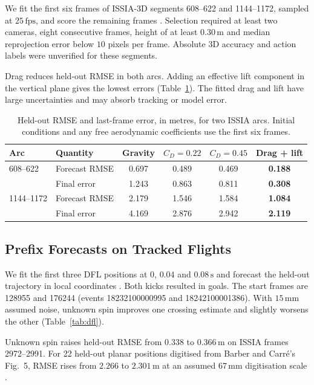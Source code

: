 \documentclass[11pt,a4paper]{article}
\begin{document}
We fit the first six frames of ISSIA-3D segments 608--622 and 1144--1172, sampled at $25\,\mathrm{fps}$, and score the remaining frames \cite{soccernetv3d,issia}. Selection required at least two cameras, eight consecutive frames, height of at least $0.30\,\mathrm{m}$ and median reprojection error below $10$ pixels per frame. Absolute 3D accuracy and action labels were unverified for these segments.

Drag reduces held-out RMSE in both arcs. Adding an effective lift component in the vertical plane gives the lowest errors (Table~\ref{tab:issia}). The fitted drag and lift have large uncertainties and may absorb tracking or model error.

\begin{table}[htbp]
  \centering
  \caption{Held-out RMSE and last-frame error, in metres, for two ISSIA arcs. Initial conditions and any free aerodynamic coefficients use the first six frames.}
  \label{tab:issia}
  \begin{tabular}{llcccc}
    \toprule
    Arc & Quantity & Gravity & $C_D=0.22$ & $C_D=0.45$ & Drag + lift \\
    \midrule
    608--622 & Forecast RMSE & 0.697 & 0.489 & 0.469 & \textbf{0.188} \\
             & Final error   & 1.243 & 0.863 & 0.811 & \textbf{0.308} \\
    1144--1172 & Forecast RMSE & 2.179 & 1.546 & 1.584 & \textbf{1.084} \\
               & Final error   & 4.169 & 2.876 & 2.942 & \textbf{2.119} \\
    \bottomrule
  \end{tabular}
\end{table}

\subsection{Prefix Forecasts on Tracked Flights}
\label{sec:dfl}

We fit the first three DFL positions at $0$, $0.04$ and $0.08\,\mathrm{s}$ and forecast the held-out trajectory in local coordinates \cite{dfl2025}. Both kicks resulted in goals. The start frames are 128955 and 176244 (events 18232100000995 and 18242100001386). With $15\,\mathrm{mm}$ assumed noise, unknown spin improves one crossing estimate and slightly worsens the other (Table~\ref{tab:dfl}).

Unknown spin raises held-out RMSE from $0.338$ to $0.366\,\mathrm{m}$ on ISSIA frames 2972--2991. For 22 held-out planar positions digitised from Barber and Carr\'e's Fig.~5, RMSE rises from $2.266$ to $2.301\,\mathrm{m}$ at an assumed $67\,\mathrm{mm}$ digitisation scale \cite{barber2010}.
\end{document}
